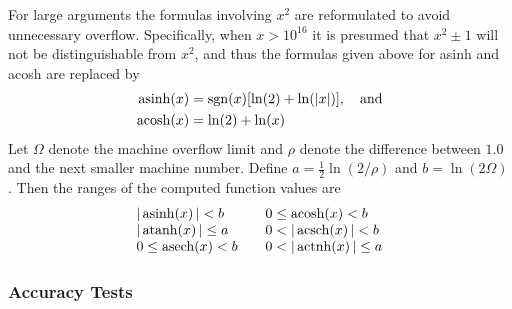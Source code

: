 \documentclass[twoside]{MATH77}
\begin{document}
For large arguments the formulas involving $x^2$ are reformulated to avoid
unnecessary overflow. Specifically, when $x > 10^{16}$ it is presumed that $%
x^2 \pm 1$ will not be distinguishable from $x^2$, and thus the formulas
given above for asinh and acosh are replaced by
\begin{align*}
\asinh(x) &= \sgn (x) [\ln (2) + \ln (|x|)], \quad \text{and}\\
\acosh(x) &= \ln (2) + \ln (x)
\end{align*}
Let $\Omega $ denote the machine overflow limit and $\rho $ denote
the difference between $1.0$ and the next smaller machine number. Define $a
= \frac{1}{2} \ln (2/\rho )$ and $b = \ln (2\Omega )$. Then the
ranges of the computed function values are
\begin{equation*}
\begin{array}{l@{\qquad }l}
|\asinh(x)\,| < b & 0 \leq \acosh(x) < b\\
|\atanh(x)\,| \leq a & 0 < |\acsch(x)\,| < b\\
0 \leq \asech(x) < b & 0 < |\actnh(x)\,| \leq a
\end{array}
\end{equation*}
\subsubsection{Accuracy Tests}
\end{document}
